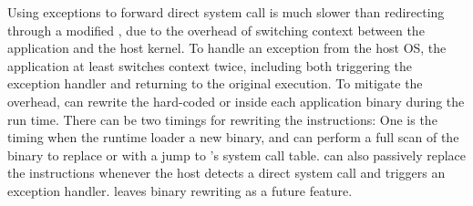 Using exceptions to forward direct system call is much slower than redirecting through a modified \libc{},
due to the overhead of switching context between the application and the host kernel.
To handle an exception from the host OS,
the application at least switches context twice, including both triggering the exception handler and returning to the original execution.
To mitigate the overhead,
\thelibos{} can 
rewrite the hard-coded  or  inside each application binary during the run time.
There can be two timings for rewriting the instructions:
One is the timing when the runtime loader a new binary, and \thelibos{} can perform a full scan of the binary
to replace  or  with a jump to \thelibos{}'s system call table.
\thelibos{} can also passively replace the instructions
whenever the host detects a direct system call and triggers an exception handler.
\graphene{} leaves binary rewriting
as a future feature.


